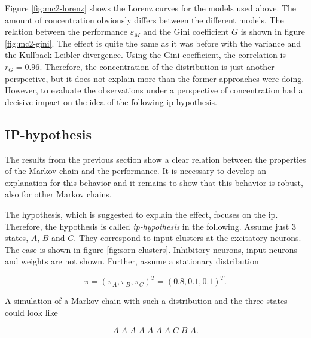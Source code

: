 Figure \ref{fig:mc2-lorenz} shows the Lorenz curves for the models used above. The amount of concentration obviously differs between the different models. The relation between the performance $\varepsilon_M$ and the Gini coefficient $G$ is shown in figure \ref{fig:mc2-gini}. The effect is quite the same as it was before with the variance and the Kullback-Leibler divergence. Using the Gini coefficient, the correlation is $r_G = 0.96$. Therefore, the concentration of the distribution is just another perspective, but it does not explain more than the former approaches were doing. However, to evaluate the observations under a perspective of concentration had a decisive impact on the idea of the following \acs{ip}-hypothesis.

\subsection{IP-hypothesis}
\label{sec:ip-hyp}

The results from the previous section show a clear relation between the properties of the Markov chain and the performance. It is necessary to develop an explanation for this behavior and it remains to show that this behavior is robust, also for other Markov chains.

The hypothesis, which is suggested to explain the effect, focuses on the \acf{ip}. Therefore, the hypothesis is called \emph{\acs{ip}-hypothesis} in the following. Assume just $3$ states, $A$, $B$ and $C$. They correspond to input clusters at the excitatory neurons. The case is shown in figure \ref{fig:sorn-clusters}. Inhibitory neurons, input neurons and weights are not shown. Further, assume a stationary distribution

\begin{equation}
\pi = (\pi_A, \pi_B, \pi_C)^T = (0.8, 0.1, 0.1)^T.
\end{equation}

A simulation of a Markov chain with such a distribution and the three states could look like

\begin{equation}
A\;A\;A\;A\;A\;A\;A\;C\;B\;A.
\end{equation}

